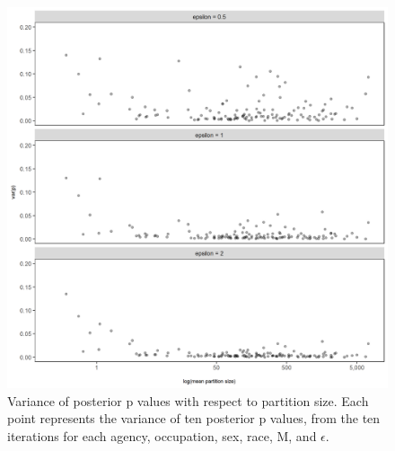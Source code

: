 \documentclass[10pt, letterpaper]{article}
\begin{document}
\begin{spacing}{1.0}
\begin{figure}[]
    \centering
    \includegraphics[width=6in]{RacePayDifferential-p-Variance-Partition-Size.png}
    \caption{Variance of posterior p values with respect to partition size.  Each point represents the variance of ten posterior p values, from the ten iterations for each agency, occupation, sex, race, M, and $\epsilon$.}
    \label{figure:RacePayDifferential-p-Variance-Partition-Size}
\end{figure}

\clearpage


\end{spacing}
\end{document}
